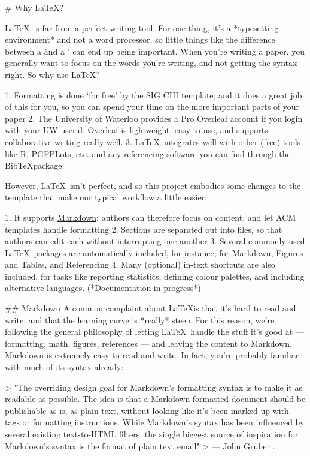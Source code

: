 %
%
\begin{markdown}

# Why \LaTeX?

\LaTeX\ is far from a perfect writing tool. For one thing, it's a *typesetting environment* and not a word processor, so little things like the difference between a \` and a ' can end up being important. When you're writing a paper, you generally want to focus on the words you're writing, and not getting the syntax right. So why use \LaTeX?

1. Formatting is done `for free' by the SIG CHI template, and it does a great job of this for you, so you can spend your time on the more important parts of your paper
2. The University of Waterloo provides a Pro Overleaf account if you login with your UW userid. Overleaf is lightweight, easy-to-use, and supports collaborative writing really well. 
3. \LaTeX\ integrates well with other (free) tools like R, PGFPLots, etc. and any referencing software you can find through the Bib\TeX package.

However, \LaTeX\ isn't perfect, and so this project embodies some changes to the template that make our typical workflow a little easier:

1. It supports \href{https://daringfireball.net/projects/markdown/}{Markdown}: authors can therefore focus on content, and let ACM templates handle formatting
2. Sections are separated out into files, so that authors can edit each without interrupting one another
3. Several commonly-used \LaTeX\ packages are automatically included, for instance, for Markdown, Figures and Tables, and Referencing
4. Many (optional) in-text shortcuts are also included, for tasks like reporting statistics, defining colour palettes, and including alternative languages. (*Documentation in-progress*)



## Markdown
A common complaint about \LaTeX is that it's hard to read and write, and that the learning curve is *really* steep. For this reason, we're following the general philosophy of letting \LaTeX\ handle the stuff it's good at --- formatting, math, figures, references --- and leaving the content to Markdown. Markdown is extremely easy to read and write. In fact, you're probably familiar with much of its syntax already: 

>    "The overriding design goal for Markdown’s formatting syntax is to make it as readable as possible. The idea is that a Markdown-formatted document should be publishable as-is, as plain text, without looking like it’s been marked up with tags or formatting instructions. While Markdown’s syntax has been influenced by several existing text-to-HTML filters, the single biggest source of inspiration for Markdown’s syntax is the format of plain text email"
> --- John Gruber \citep{gruber2006}.


\end{markdown}

